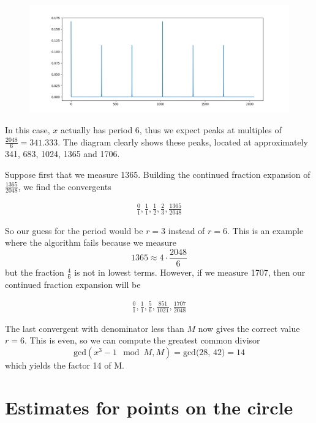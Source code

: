 \documentclass[a4paper, draft]{article}
\theoremstyle{own}
\theoremstyle{remark}
\begin{document}
\begin{figure}[ht]
\centering
\includegraphics[width=1\linewidth]{images/ShorSample}
\caption[Distribution of s]{}
\label{fig:ShorSample}
\end{figure}

In this case, $x$ actually has period 6, thus we expect peaks at multiples of $\frac{2048}{6} = 341.333$. The diagram clearly shows these peaks, located at approximately 341, 683, 1024, 1365 and 1706. 

Suppose first that we measure 1365. Building the continued fraction expansion of $\frac{1365}{2048}$, we find the convergents

\begin{align*}
\frac{0}{1}, \frac{1}{1}, 
\frac{1}{2}, 
\frac{2}{3}, 
\frac{1365}{2048} 
\end{align*}

So our guess for the period would be $r = 3$ instead of $r = 6$. This is an example where the algorithm fails because we measure
$$
1365 \approx 4 \cdot \frac{2048}{6}
$$
but the fraction $\frac{4}{6}$ is not in lowest terms. However, if we measure 1707, then our continued fraction expansion will be

\begin{align*}
\frac{0}{1}, 
\frac{1}{1}, 
\frac{5}{6}, 
\frac{851}{1021}, 
\frac{1707}{2048} 
\end{align*}

The last convergent with denominator less than $M$ now gives the correct value $r=6$. This is even, so we can compute the greatest common divisor 
$$
\text{gcd}(x^3 -1 \mod M, M) = \text{gcd(28, 42)} = 14
$$
which yields the factor 14 of M.


\appendix
	
\section{Estimates for points on the circle}
\end{document}
